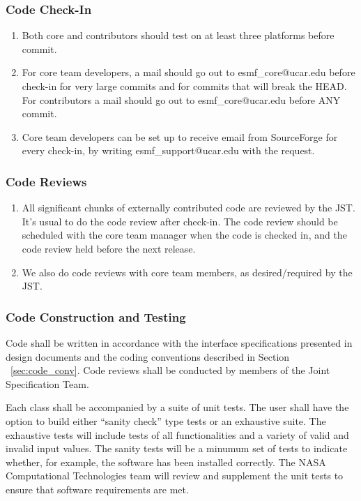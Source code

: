 \subsubsection{Code Check-In}
\begin{enumerate}
\item Both core and contributors should test on at least three platforms before commit.
\item For core team developers, a mail should go out to esmf\_core@ucar.edu
before check-in for very large commits and for commits that will break the
HEAD. For contributors a mail should go out to esmf\_core@ucar.edu before
ANY commit.
\item Core team developers can be set up to receive email from SourceForge
for every check-in, by writing esmf\_support@ucar.edu with the request.
\end{enumerate}

\subsubsection{Code Reviews}
\begin{enumerate}
\item All significant chunks of externally contributed code are reviewed
by the JST. It's usual to do the code review after check-in. The code review should
be scheduled with the core team manager when the code is checked in, and
the code review held before the next release.
\item We also do code reviews with core team members, as desired/required
by the JST. 
\end{enumerate}

\subsubsection {Code Construction and Testing}

Code shall be written in accordance with the interface specifications
presented in design documents and the coding conventions described in 
Section ~\ref{sec:code_conv}.  Code reviews shall be conducted by members 
of the Joint Specification Team.

Each class shall be accompanied by a suite of unit tests.  The user
shall have the option to build either ``sanity check'' type tests or an 
exhaustive suite.  The exhaustive tests will include tests of all
functionalities and a variety of valid and invalid input values. The
sanity tests will be a minumum set of tests to indicate whether, for
example, the software has been installed correctly.  The NASA Computational 
Technologies team will review and supplement the unit tests to ensure 
that software requirements are met.

